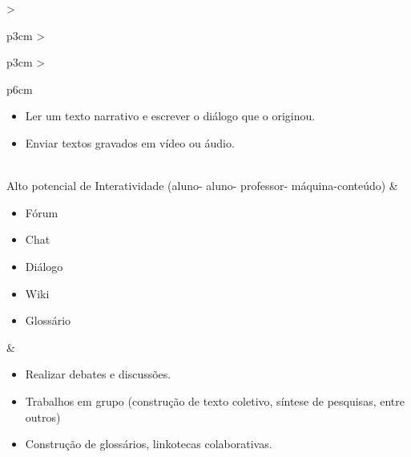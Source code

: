 \begin{table}[h!]
\begin{threeparttable}
\begin{tabular}{>{\raggedright\arraybackslash}p{3cm} >{\raggedright\arraybackslash}p{3cm} >{\raggedright\arraybackslash}p{6cm}}
\begin{minipage}[t]{\linewidth}
\begin{itemize}[leftmargin=*,topsep=-0pt,partopsep=0pt,parsep=0pt,itemsep=0pt]
    \item Ler um texto narrativo e escrever o diálogo que o originou.
    \item Enviar textos gravados em vídeo ou áudio.
\end{itemize} 
\end{minipage}
\\
Alto potencial de Interatividade (aluno- aluno- professor- máquina-conteúdo) &
\begin{minipage}[t]{\linewidth}
\begin{itemize}[leftmargin=*,topsep=-0pt,partopsep=0pt,parsep=0pt,itemsep=0pt]
    \item Fórum
    \item Chat
    \item Diálogo
    \item Wiki
    \item Glossário
\end{itemize} 
\end{minipage}
&
\begin{minipage}[t]{\linewidth}
\begin{itemize}[leftmargin=*,topsep=-0pt,partopsep=0pt,parsep=0pt,itemsep=0pt]
    \item Realizar debates e discussões.
    \item Trabalhos em grupo (construção de texto coletivo, síntese de pesquisas, entre outros)
    \item Construção de glossários, linkotecas colaborativas.
\end{itemize}  
\end{minipage}
\\
\bottomrule
\end{tabular}
\end{threeparttable}
\end{table}

